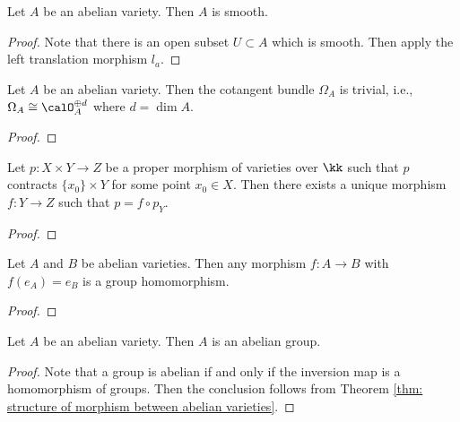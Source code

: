     \begin{proposition}\label{prop: abelian varieties are smooth}
        Let \( A \) be an abelian variety. 
        Then \( A \) is smooth.
    \end{proposition}
    \begin{proof}
        Note that there is an open subset \(U\subset A\) which is smooth.
        Then apply the left translation morphism \(l_a\).
    \end{proof}

    \begin{proposition}\label{prop: abelian varieties have trivial cotangent bundle}
        Let \( A \) be an abelian variety.
        Then the cotangent bundle \( \Omega_A \) is trivial, i.e., \(\Omega_A \cong \calO_A^{\oplus d}\) where \(d = \dim A\).
    \end{proposition}
    \begin{proof}
    \end{proof}

    \begin{lemma}\label{lem: rigidity lemma for X product type}
        Let \(p: X \times Y \to Z\) be a proper morphism of varieties over \(\kk\) such that \(p\) contracts \(\{x_0\} \times Y\) for some point \(x_0 \in X\).
        Then there exists a unique morphism \(f: Y \to Z\) such that \(p = f \circ p_Y\).
    \end{lemma}
    \begin{proof}
    \end{proof}

    \begin{theorem}\label{thm: structure of morphism between abelian varieties}
        Let \(A\) and \(B\) be abelian varieties. 
        Then any morphism \(f: A \to B\) with \(f(e_A) = e_B\) is a group homomorphism.
    \end{theorem}
    \begin{proof}
    \end{proof}

    \begin{proposition}\label{prop: abelian varieties are abelian groups}
        Let \( A \) be an abelian variety. 
        Then \( A \) is an abelian group.
    \end{proposition}
    \begin{proof}
        Note that a group is abelian if and only if the inversion map is a homomorphism of groups.
        Then the conclusion follows from Theorem \ref{thm: structure of morphism between abelian varieties}.
    \end{proof}

